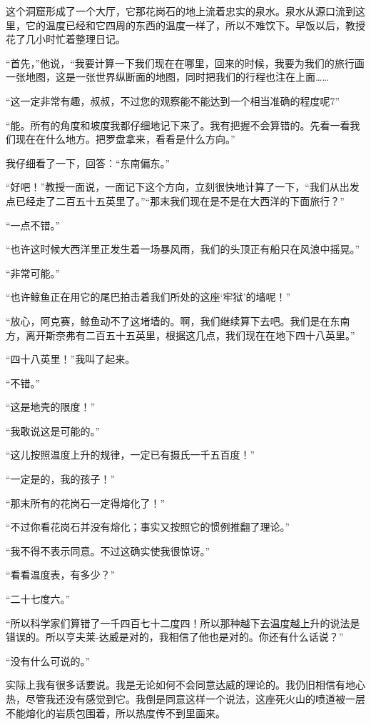 \documentclass[10pt]{book}
\begin{document}
这个洞窟形成了一个大厅，它那花岗石的地上流着忠实的泉水。泉水从源口流到这里，它的温度已经和它四周的东西的温度一样了，所以不难饮下。早饭以后，教授花了几小时忙着整理日记。

“首先，”他说，“我要计算一下我们现在在哪里，回来的时候，我要为我们的旅行画一张地图，这是一张世界纵断面的地图，同时把我们的行程也注在上面……

“这一定非常有趣，叔叔，不过您的观察能不能达到一个相当准确的程度呢7”

“能。所有的角度和坡度我都仔细地记下来了。我有把握不会算错的。先看一看我们现在在什么地方。把罗盘拿来，看看是什么方向。”

我仔细看了一下，回答：“东南偏东。”

“好吧！”教授一面说，一面记下这个方向，立刻很快地计算了一下，“我们从出发点已经走了二百五十五英里了。”“那末我们现在是不是在大西洋的下面旅行？”

“一点不错。”

“也许这时候大西洋里正发生着一场暴风雨，我们的头顶正有船只在风浪中摇晃。”

“非常可能。”

“也许鲸鱼正在用它的尾巴拍击着我们所处的这座‘牢狱’的墙呢！”

“放心，阿克赛，鲸鱼动不了这堵墙的。啊，我们继续算下去吧。我们是在东南方，离开斯奈弗有二百五十五英里，根据这几点，我们现在在地下四十八英里。”

“四十八英里！”我叫了起来。

“不错。”

“这是地壳的限度！”

“我敢说这是可能的。”

“这儿按照温度上升的规律，一定已有摄氏一千五百度！”

“一定是的，我的孩子！”

“那末所有的花岗石一定得熔化了！”

“不过你看花岗石并没有熔化；事实又按照它的惯例推翻了理论。”

“我不得不表示同意。不过这确实使我很惊讶。”

“看看温度表，有多少？”

“二十七度六。”

“所以科学家们算错了一千四百七十二度四！所以那种越下去温度越上升的说法是错误的。所以亨夫莱-达威是对的，我相信了他也是对的。你还有什么话说？”

“没有什么可说的。”

实际上我有很多话要说。我是无论如何不会同意达威的理论的。我仍旧相信有地心热，尽管我还没有感觉到它。我倒是同意这样一个说法，这座死火山的喷道被一层不能熔化的岩质包围着，所以热度传不到里面来。
\end{document}
